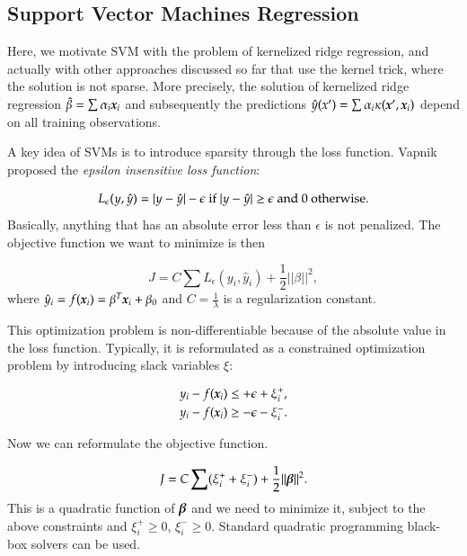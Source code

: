 \begin{refsection}
\subsection*{Support Vector Machines Regression}

Here, we motivate SVM with the problem of kernelized ridge regression, and actually with other approaches discussed so far that use the kernel trick, where the solution is not sparse. More precisely, the solution of kernelized ridge regression $\hat{\beta} = \sum \alpha_i \boldsymbol{x}_i$ and subsequently the predictions  $\hat{y}(x')  = \sum \alpha_i \kappa(\boldsymbol{x}',\boldsymbol{x}_i)$ depend on all training observations.

A key idea of SVMs is to introduce sparsity through the loss function. Vapnik proposed the \emph{epsilon insensitive loss function}:

$$L_\epsilon(y, \hat{y}) = |y-\hat{y}| - \epsilon\ {\rm if}\ |y-\hat{y}| \geq \epsilon\ {\rm and}\ 0\  {\rm otherwise}.$$
Basically, anything that has an absolute error less than $\epsilon$ is not penalized. The objective function we want to minimize is then

$$J = C\sum L_\epsilon(y_i, \hat{y}_i) + \frac{1}{2}\lvert\lvert \beta \rvert\rvert^2,$$
%
where $\hat{y}_i = f(\boldsymbol{x}_i) = \beta^T \boldsymbol{x}_i + \beta_0$ and $C = \frac{1}{\lambda}$ is a regularization constant.

This optimization problem is non-differentiable because of the absolute value in the loss function. Typically, it is reformulated as a constrained optimization problem by introducing slack variables $\xi$:

\begin{align*}
y_i - f(\boldsymbol{x}_i) & \leq + \epsilon + \xi_i^+, \\
y_i -  f(\boldsymbol{x}_i) & \geq - \epsilon - \xi_i^-.
\end{align*}

Now we can reformulate the objective function.

$$J = C\sum (\xi_i^+ + \xi_i^-) + \frac{1}{2}\lvert\lvert \boldsymbol{\beta} \rvert\rvert^2.$$
%
This is a quadratic function of $\boldsymbol{\beta}$ and we need to minimize it, subject to the above constraints and $\xi_i^+ \geq 0$, $\xi_i^- \geq 0$. Standard quadratic programming black-box solvers can be used.


\end{refsection}
